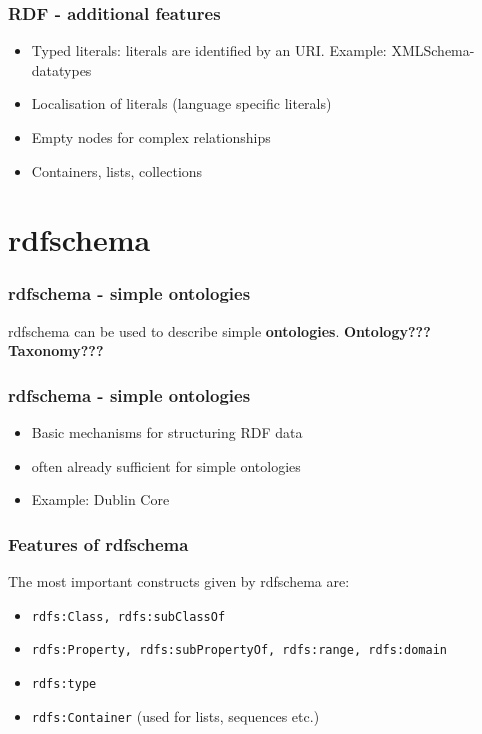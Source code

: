 \documentclass[handout]{beamer}
\begin{document}
       \begin{frame}
           \frametitle{RDF - additional features}
           \begin{itemize}
               \item Typed literals: literals are identified by an URI. Example: XMLSchema-datatypes
               \pause
               \item Localisation of literals (language specific literals)
               \pause
               \item Empty nodes for complex relationships
               \pause
               \item Containers, lists, collections
               \pause
           \end{itemize}
       \end{frame}


    \section{rdfschema}

       \begin{frame}
           \frametitle{rdfschema - simple ontologies}

           rdfschema can be used to describe simple \textbf{ontologies}.
           \vskip 0.7cm
           \pause
           \textbf{Ontology???}
           \vskip 0.3cm
           \pause
           \textbf{Taxonomy???}
       \end{frame}

       \begin{frame}
           \frametitle{rdfschema - simple ontologies}

           \begin{itemize}
               \item Basic mechanisms for structuring RDF data
               \pause
               \item often already sufficient for simple ontologies
               \pause
               \item Example: Dublin Core
            \end{itemize}
       \end{frame}

       \begin{frame}
           \frametitle{Features of rdfschema}

           The most important constructs given by rdfschema are:
           \vskip 0.7cm
           \pause
           \begin{itemize}
               \item \texttt{rdfs:Class, rdfs:subClassOf}
               \pause
               \item \texttt{rdfs:Property, rdfs:subPropertyOf, rdfs:range, rdfs:domain}
               \pause
               \item \texttt{rdfs:type}
               \pause
               \item \texttt{rdfs:Container} (used for lists, sequences etc.)
           \end{itemize}
       \end{frame}
\end{document}
